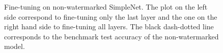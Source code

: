 \begin{figure}
\begin{subfigure}[b]{\textwidth}
     \end{subfigure}
     \caption{Fine-tuning on non-watermarked SimpleNet. The plot on the left side correspond to fine-tuning only the last layer and the one on the right hand side to fine-tuning all layers. The black dash-dotted line corresponds to the benchmark test accuracy of the non-watermarked model.}
     
     \label{fig:finetuning_all_vs_last_layers}
\end{figure}